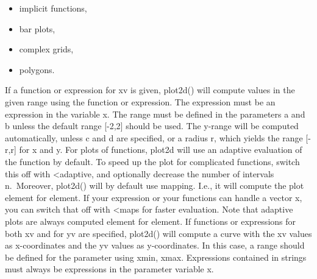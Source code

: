 \documentclass[
]{book}
\begin{document}
\begin{itemize}
\item
  implicit functions,
\item
  bar plots,
\item
  complex grids,
\item
  polygons.
\end{itemize}

If a function or expression for xv is given, plot2d() will compute values in the given range using the function or expression. The expression must be an expression in the variable x. The range must be defined in the parameters a and b unless the default range {[}-2,2{]} should be used. The y-range will be computed automatically, unless c and d are specified, or a radius r, which yields the range {[}-r,r{]} for x and y. For plots of functions, plot2d will use an adaptive evaluation of the function by default. To speed up the plot for complicated functions, switch this off with \textless adaptive, and optionally decrease the number of intervals n.~Moreover, plot2d() will by default use mapping. I.e., it will compute the plot element for element. If your expression or your functions can handle a vector x, you can switch that off with \textless maps for faster evaluation. Note that adaptive plots are always computed element for element. If functions or expressions for both xv and for yv are specified, plot2d() will compute a curve with the xv values as x-coordinates and the yv values as y-coordinates. In this case, a range should be defined for the parameter using xmin, xmax. Expressions contained in strings must always be expressions in the parameter variable x.

\backmatter
\end{document}
